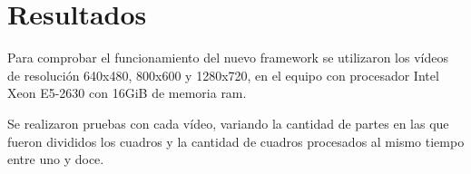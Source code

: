 
\section{Resultados}

Para comprobar el funcionamiento del nuevo framework se utilizaron los vídeos de
resolución 640x480, 800x600 y 1280x720, en el equipo con procesador Intel Xeon
E5-2630 con 16GiB de memoria ram.

Se realizaron pruebas con cada vídeo, variando la cantidad de partes en las que
fueron divididos los cuadros y la cantidad de cuadros procesados al mismo tiempo
entre uno y doce.
